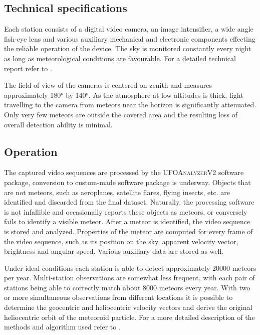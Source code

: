     \subsection{Technical specifications} \label{iAt}
        Each station consists of a digital video camera, an image intensifier, a wide angle fish-eye lens
        and various auxiliary mechanical and electronic components effecting
        the reliable operation of the device. The sky is monitored constantly every night
        as long as meteorological conditions are favourable. For a detailed technical report refer to \citet{zigo2013}.

        The field of view of the cameras is centered on zenith and measures approximately \ang{180} by \ang{140}.
        As the atmosphere at low altitudes is thick, light travelling to the camera from
        meteors near the horizon is significantly attenuated.
        Only very few meteors are outside the covered area and the resulting loss of overall detection ability is minimal.

    \subsection{Operation} \label{iAo}
        The captured video sequences are processed by the \textsc{UFOAnalyzerV2} software package,
        conversion to custom-made software package is underway.
        Objects that are not meteors, such as aeroplanes, satellite flares, flying insects, etc.
        are identified and discarded from the final dataset. Naturally, the processing software is not
        infallible and occasionally reports these objects as meteors, or conversely fails to identify a visible meteor.
        After a meteor is identified, the video sequence is stored and analyzed.
        Properties of the meteor are computed for every frame of the video sequence,
        such as its position on the sky, apparent velocity vector, brightness and angular speed.
        Various auxiliary data are stored as well.

        Under ideal conditions each station is able to detect approximately 20000 meteors per year.
        Multi-station observations are somewhat less frequent, with each pair of stations being able
        to correctly match about 8000 meteors every year.
        With two or more simultaneous observations from different locations it is possible to determine
        the geocentric and heliocentric velocity vectors and derive the original heliocentric orbit of the meteoroid particle.
        For a more detailed description of the methods and algorithm used refer to \citet{fero?}.

